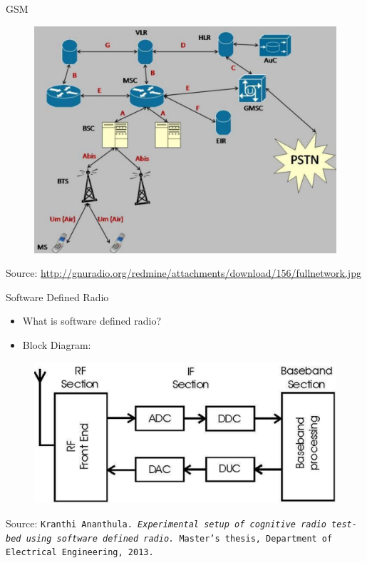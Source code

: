 \documentclass{beamer}
\begin{document}
   \begin{frame}{GSM}
    \begin{minipage}[t][0.8\textheight][t]{\textwidth}
      \begin{figure}
        \centering
        \includegraphics[width=0.8\linewidth]{img/gsmNetwork}
      \end{figure}
      \vfill
      \tiny{Source: \url{http://gnuradio.org/redmine/attachments/download/156/fullnetwork.jpg}}
    \end{minipage}
  \end{frame}
 
  \begin{frame}{Software Defined Radio}
    \begin{minipage}[t][0.8\textheight][t]{\textwidth}
      \begin{itemize}
	\item What is software defined radio?
	\item Block Diagram:
      \end{itemize}
      \begin{figure}
	\centering
	\includegraphics[width=\linewidth]{img/sdrBlock}
      \end{figure}
      \vfill
      \tiny{Source: \texttt{Kranthi Ananthula. \emph{Experimental setup of cognitive radio test-bed using software
defined radio.} Master's thesis, Department of Electrical Engineering, 2013.}}
   \end{minipage}
  \end{frame}
\end{document}
